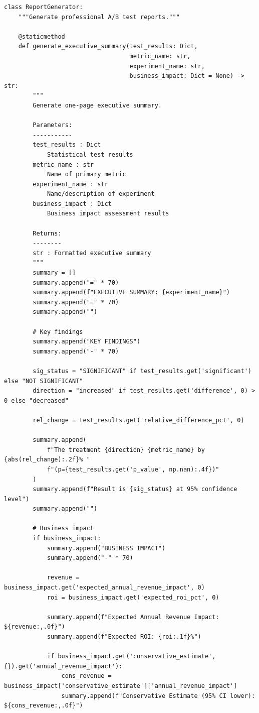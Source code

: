 \lstset{language=Python, caption=Executive Summary Generation}
\begin{lstlisting}
class ReportGenerator:
    """Generate professional A/B test reports."""

    @staticmethod
    def generate_executive_summary(test_results: Dict,
                                   metric_name: str,
                                   experiment_name: str,
                                   business_impact: Dict = None) -> str:
        """
        Generate one-page executive summary.

        Parameters:
        -----------
        test_results : Dict
            Statistical test results
        metric_name : str
            Name of primary metric
        experiment_name : str
            Name/description of experiment
        business_impact : Dict
            Business impact assessment results

        Returns:
        --------
        str : Formatted executive summary
        """
        summary = []
        summary.append("=" * 70)
        summary.append(f"EXECUTIVE SUMMARY: {experiment_name}")
        summary.append("=" * 70)
        summary.append("")

        # Key findings
        summary.append("KEY FINDINGS")
        summary.append("-" * 70)

        sig_status = "SIGNIFICANT" if test_results.get('significant') else "NOT SIGNIFICANT"
        direction = "increased" if test_results.get('difference', 0) > 0 else "decreased"

        rel_change = test_results.get('relative_difference_pct', 0)

        summary.append(
            f"The treatment {direction} {metric_name} by {abs(rel_change):.2f}% "
            f"(p={test_results.get('p_value', np.nan):.4f})"
        )
        summary.append(f"Result is {sig_status} at 95% confidence level")
        summary.append("")

        # Business impact
        if business_impact:
            summary.append("BUSINESS IMPACT")
            summary.append("-" * 70)

            revenue = business_impact.get('expected_annual_revenue_impact', 0)
            roi = business_impact.get('expected_roi_pct', 0)

            summary.append(f"Expected Annual Revenue Impact: ${revenue:,.0f}")
            summary.append(f"Expected ROI: {roi:.1f}%")

            if business_impact.get('conservative_estimate', {}).get('annual_revenue_impact'):
                cons_revenue = business_impact['conservative_estimate']['annual_revenue_impact']
                summary.append(f"Conservative Estimate (95% CI lower): ${cons_revenue:,.0f}")


\end{lstlisting}
